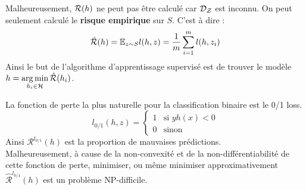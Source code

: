


Malheureusement, $\mathcal{R}(h)$ ne peut pas être calculé car $\mathcal{D_Z}$ est inconnu. On peut seulement calculé le \textbf{risque empirique} sur $S$. C'est à dire :
$$ \hat{\mathcal{R}}(h) = \mathbb{E}_{z \sim S} l(h, z) = \frac{1}{m} \sum_{i = 1}^{m} l(h, z_i) $$
Ainsi le but de l'algorithme d'apprentissage supervisé est de trouver le modèle $\displaystyle h = \operatorname*{arg\,min}_{h_i \in \mathcal{H}} \hat{\mathcal{R}}(h_i)$.

\exe
La fonction de perte la plus naturelle pour la classification binaire est le 0/1 loss.
$$ l_{0/1}(h, z) = \left\{ \begin{array}{ll}
	1 & \text{si } yh(x) < 0 \\
	0 & \text{sinon}
\end{array}
\right. $$
Ainsi $\mathcal{R}^{l_{0/1}}(h)$ est la proportion de mauvaises prédictions. \\
Malheureusement, à cause de la non-convexité et de la non-différentiabilité de cette fonction de perte, minimiser, ou même minimiser approximativement $\mathcal{\hat{R}}^{l_{0/1}}(h)$ est un problème NP-difficile.


